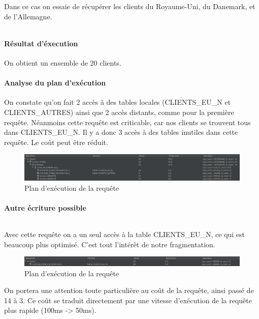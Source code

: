 \documentclass[10pt,a4paper]{article}
\theoremstyle{plain}
\begin{document}
Dans ce cas on essaie de récupérer les clients du Royaume-Uni, du Danemark, et de l'Allemagne.
\inputminted{sql}{INSA-DB12-EuropeNord-req2.sql}

\paragraph{Résultat d'éxecution}

On obtient un ensemble de 20 clients.

\paragraph{Analyse du plan d'exécution}

On constate qu'on fait 2 accès à des tables locales (CLIENTS\_EU\_N et CLIENTS\_AUTRES) ainsi que 2 accès distants, comme pour la première requête. Néanmoins cette requête est criticable, car nos clients se trouvent tous dans CLIENTS\_EU\_N. Il y a donc 3 accès à des tables inutiles dans cette requête. Le coût peut être réduit.

\begin{figure}[H]
    \centering
    \includegraphics[width=15cm]{INSA-DB12-EuropeNord-plan-exec-vues-distante2.png}
    \caption{Plan d'exécution de la requête}
\end{figure}

\paragraph{Autre écriture possible}

\inputminted{sql}{INSA-DB12-EuropeNord-req3.sql}

Avec cette requête on a un seul accès à la table CLIENTS\_EU\_N, ce qui est beaucoup plus optimisé. C'est tout l'intérêt de notre fragmentation.

\begin{figure}[H]
    \centering
    \includegraphics[width=15cm]{INSA-DB12-EuropeNord-plan-exec-vues-distante3.png}
    \caption{Plan d'exécution de la requête}
\end{figure}

On portera une attention toute particulière au coût de la requête, ainsi passé de 14 à 3. Ce coût se traduit directement par une vitesse d'exécution de la requête plus rapide (100ms -> 50ms).
\end{document}
